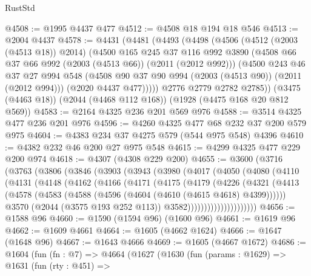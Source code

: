 \begin{lexlean}{RustStd}
\begin{coremodule}
{\begin{coremodule}
{{{{{{{{{{{{{{@4508 := @1995 @4437 @477
@4512 := @4508 @18 @194 @18 @546
@4513 := @2004 @4437
@4578 := @4431
    (@4481
      (@4493
        (@4498
          (@4506
            (@4512 (@2003 (@4513 @18)) @2014)
            (@4500
              @165
              @245
              @37
              @116
              @992
              @3890
              (@4508 @66 @37 @66 @992 (@2003 (@4513 @66)) (@2011 (@2012 @992)))
              (@4500
                @243
                @46
                @37
                @27
                @994
                @548
                (@4508 @90 @37 @90 @994 (@2003 (@4513 @90)) (@2011 (@2012 @994)))
                (@2020 @4437 @477)))))
        @2776
        @2779
        @2782
        @2785))
    (@3475 (@4463 @18))
    (@2044 (@4468 @112 @168))
    (@1928 (@4475 @168 @20 @812 @569))
@4583 := @2164 @4325 @236 @201 @569 @976
@4588 := @3514 @4325 @477 @236 @201 @976
@4596 := @4260 @4325 @477 @68 @232 @37 @200 @579 @975
@4604 := @4383 @234 @37 @4275 @579 (@544 @975 @548) @4396
@4610 := @4382 @232 @46 @200 @27 @975 @548
@4615 := @4299 @4325 @477 @229 @200 @974
@4618 := @4307 (@4308 @229 @200)
@4655 := @3600
    (@3716
      (@3763
        (@3806
          (@3846
            (@3903
              (@3943
                (@3980
                  (@4017
                    (@4050
                      (@4080
                        (@4110
                          (@4131
                            (@4148
                              (@4162
                                (@4166
                                  (@4171
                                    (@4175
                                      (@4179
                                        (@4226
                                          (@4321
                                            (@4413
                                              (@4578
                                                (@4583
                                                  (@4588
                                                    (@4596 (@4604 (@4610 (@4615 @4618) @4399))))))
                                              @3570
                                              (@2044 (@3575 @193 @252 @113))
                                              @3582)))))))))))))))))))))
@4656 := @1588 @96
@4660 := @1590 (@1594 @96) (@1600 @96)
@4661 := @1619 @96
@4662 := @1609 @4661
@4664 := @1605 (@4662 @1624)
@4666 := @1647 (@1648 @96)
@4667 := @1643 @4666
@4669 := @1605 (@4667 @1672)
@4686 := @1604
    (fun (fn : @7) =>
    @4664
      (@1627
        (@1630
          (fun (params : @1629) =>
          @1631
            (fun (rty : @451) =>
}}}}}}}}}}}}}}
\end{coremodule}}
\end{coremodule}
\end{lexlean}
